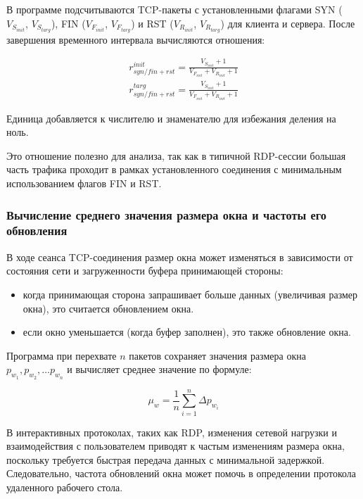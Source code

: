 \documentclass[bachelor, och, coursework]{SCWorks}
\begin{document}
В программе подсчитываются TCP-пакеты с установленными флагами SYN ($V_{S_{init}}$, $V_{S_{targ}}$), FIN ($V_{F_{init}}$, $V_{F_{targ}}$) и RST 
($V_{R_{init}}$, $V_{R_{targ}}$) для клиента и сервера. После завершения временного интервала вычисляются отношения:

\begin{equation}
  \begin{aligned}
    r_{syn/fin+rst}^{init} = \frac{V_{S_{init}} + 1}{V_{F_{init}} + V_{R_{init}} + 1} \\
    r_{syn/fin+rst}^{targ} = \frac{V_{S_{init}} + 1}{V_{F_{init}} + V_{R_{init}} + 1}
  \end{aligned}
\end{equation}


Единица добавляется к числителю и знаменателю для избежания деления на ноль.

Это отношение полезно для анализа, так как в типичной RDP-сессии большая часть трафика проходит в рамках установленного соединения с 
минимальным использованием флагов FIN и RST.

\subsubsection{Вычисление среднего значения размера окна и частоты его обновления}

В ходе сеанса TCP-соединения размер окна может изменяться в зависимости от состояния сети и загруженности буфера принимающей стороны:

\begin{itemize}
  \item когда принимающая сторона запрашивает больше данных (увеличивая размер окна), это считается обновлением окна.
  \item если окно уменьшается (когда буфер заполнен), это также обновление окна.
\end{itemize}

 Программа при перехвате $n$ пакетов сохраняет значения размера окна $p_{w_1}, p_{w_2}, \dots p_{w_n}$ и вычисляет среднее значение по формуле:

 \begin{equation}
  \mu_w = \frac{1}{n} \sum_{i=1}^{n} \Delta p_{w_i}
\end{equation}

В интерактивных протоколах, таких как RDP, изменения сетевой нагрузки и взаимодействия с пользователем приводят к частым изменениям размера окна, 
поскольку требуется быстрая передача данных с минимальной задержкой. Следовательно, частота обновлений окна может помочь в определении 
протокола удаленного рабочего стола.
\end{document}
